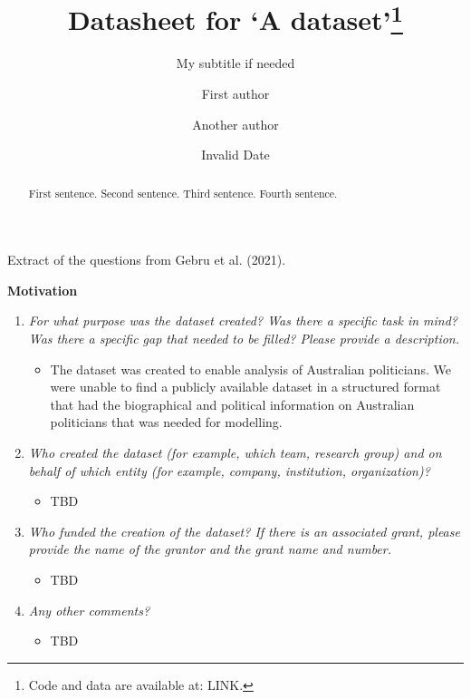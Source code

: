 \documentclass[
  letterpaper,
  DIV=11,
  numbers=noendperiod]{scrartcl}
\title{Datasheet for `A dataset'\thanks{Code and data are available at:
LINK.}}
\subtitle{My subtitle if needed}
\author{First author \and Another author}
\date{Invalid Date}
\providecommand{\tightlist}{%
  \setlength{\itemsep}{0pt}\setlength{\parskip}{0pt}}\usepackage{longtable,booktabs,array}
\begin{document}
\maketitle
\begin{abstract}
First sentence. Second sentence. Third sentence. Fourth sentence.
\end{abstract}

Extract of the questions from Gebru et al. (2021).

\textbf{Motivation}

\begin{enumerate}
\def\labelenumi{\arabic{enumi}.}
\tightlist
\item
  \emph{For what purpose was the dataset created? Was there a specific
  task in mind? Was there a specific gap that needed to be filled?
  Please provide a description.}

  \begin{itemize}
  \tightlist
  \item
    The dataset was created to enable analysis of Australian
    politicians. We were unable to find a publicly available dataset in
    a structured format that had the biographical and political
    information on Australian politicians that was needed for modelling.
  \end{itemize}
\item
  \emph{Who created the dataset (for example, which team, research
  group) and on behalf of which entity (for example, company,
  institution, organization)?}

  \begin{itemize}
  \tightlist
  \item
    TBD
  \end{itemize}
\item
  \emph{Who funded the creation of the dataset? If there is an
  associated grant, please provide the name of the grantor and the grant
  name and number.}

  \begin{itemize}
  \tightlist
  \item
    TBD
  \end{itemize}
\item
  \emph{Any other comments?}

  \begin{itemize}
  \tightlist
  \item
    TBD
  \end{itemize}
\end{enumerate}
\end{document}
